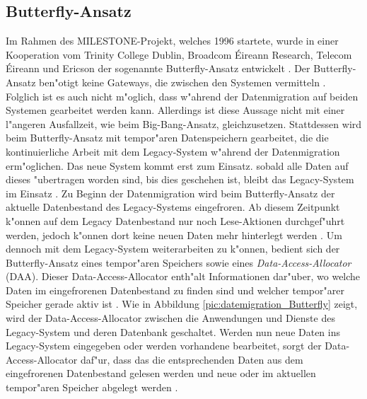 \subsection{Butterfly-Ansatz}



Im Rahmen des MILESTONE-Projekt, welches 1996 startete, wurde in einer Kooperation vom Trinity College Dublin, Broadcom \'{E}ireann Research, Telecom \'{E}ireann und Ericson der sogenannte Butterfly-Ansatz entwickelt \citep[S.~202]{wuLawlessBisbal-1997}. Der Butterfly-Ansatz ben"otigt keine Gateways, die zwischen den Systemen vermitteln \citep[S.~202]{wuLawlessBisbal-1997}. Folglich ist es auch nicht m"oglich, dass w"ahrend der Datenmigration auf beiden Systemen gearbeitet werden kann. Allerdings ist diese Aussage nicht mit einer l"angeren Ausfallzeit, wie beim Big-Bang-Ansatz, gleichzusetzen. Stattdessen wird beim Butterfly-Ansatz mit tempor"aren Datenspeichern gearbeitet, die die kontinuierliche Arbeit mit dem Legacy-System w"ahrend der Datenmigration erm"oglichen. Das neue System kommt erst zum Einsatz. sobald alle Daten auf dieses "ubertragen worden sind, bis dies geschehen ist, bleibt das Legacy-System im Einsatz \citep[S.~3]{wuLawless-1997}.
\lb
Zu Beginn der Datenmigration wird beim Butterfly-Ansatz der aktuelle Datenbestand des Legacy-Systems eingefroren. Ab diesem Zeitpunkt k"onnen auf dem Legacy Datenbestand nur noch Lese-Aktionen durchgef"uhrt werden, jedoch k"onnen dort keine neuen Daten mehr hinterlegt werden \citep[S.~202]{wuLawlessBisbal-1997}. Um dennoch mit dem Legacy-System weiterarbeiten zu k"onnen, bedient sich der Butterfly-Ansatz eines tempor"aren Speichers sowie eines \textit{Data-Access-Allocator} (DAA). Dieser Data-Access-Allocator enth"alt Informationen dar"uber, wo welche Daten im eingefrorenen Datenbestand zu finden sind und welcher tempor"arer Speicher gerade aktiv ist \citep[S.~202]{wuLawlessBisbal-1997}. Wie in Abbildung \ref{pic:datemigration_Butterfly} zeigt, wird der Data-Access-Allocator zwischen die Anwendungen und Dienste des Legacy-System und deren Datenbank geschaltet. Werden nun neue Daten ins Legacy-System eingegeben oder werden vorhandene bearbeitet, sorgt der Data-Access-Allocator daf"ur, dass das die entsprechenden Daten aus dem eingefrorenen Datenbestand gelesen werden und neue oder im aktuellen tempor"aren Speicher abgelegt werden \citep[S.~202]{wuLawlessBisbal-1997}.
\lb

